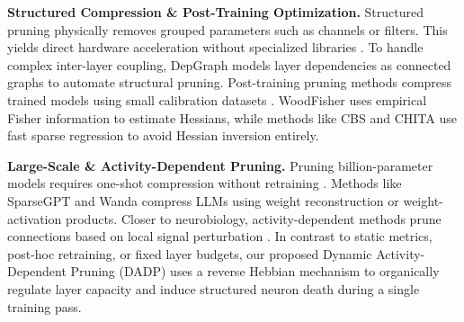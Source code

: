 \textbf{Structured Compression & Post-Training Optimization.} Structured pruning physically removes grouped parameters such as channels or filters. This yields direct hardware acceleration without specialized libraries \cite{sze2017efficient}. To handle complex inter-layer coupling, DepGraph \cite{fang2023depgraph} models layer dependencies as connected graphs to automate structural pruning. Post-training pruning methods compress trained models using small calibration datasets \cite{frantar2023sparsegpt}. WoodFisher \cite{singh2020woodfisher} uses empirical Fisher information to estimate Hessians, while methods like CBS \cite{yu2022combinatorial} and CHITA \cite{benbaki2023chita} use fast sparse regression to avoid Hessian inversion entirely.


\textbf{Large-Scale & Activity-Dependent Pruning.} Pruning billion-parameter models requires one-shot compression without retraining \cite{frantar2023sparsegpt}. Methods like SparseGPT \cite{frantar2023sparsegpt} and Wanda \cite{sun2024wanda} compress LLMs using weight reconstruction or weight-activation products. Closer to neurobiology, activity-dependent methods prune connections based on local signal perturbation \cite{dekhovich2023nnrelief, bingham2025fine}. In contrast to static metrics, post-hoc retraining, or fixed layer budgets, our proposed Dynamic Activity-Dependent Pruning (DADP) uses a reverse Hebbian mechanism to organically regulate layer capacity and induce structured neuron death during a single training pass.
